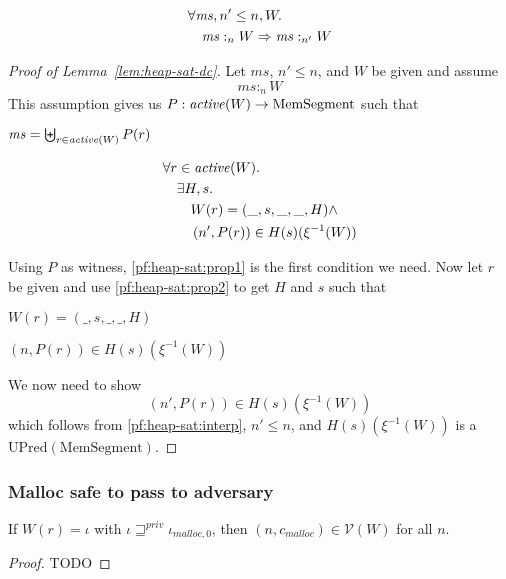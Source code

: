 \documentclass[a4paper]{article}
\newcommand{\fun}{\rightarrow}
\newcommand{\var}[1]{\mathit{#1}}
\newcommand{\hs}{\var{ms}}
\newcommand{\ms}{\hs}
\newcommand{\heap}{\var{mem}}
\newcommand{\plainfun}[2]{
  \ifthenelse{\equal{#2}{}}
  {\mathit{#1}}
  {\mathit{#1}(#2)}
}
\newcommand{\activeReg}[1]{\plainfun{active}{#1}}
\newcommand{\futurestr}{\mathbin{\sqsupseteq}^{\var{priv}}}
\newcommand{\heapSat}[3][\heap]{#1 :_{#2} #3}
\newcommand{\codelabel}[1]{\mathit{#1}}
\newcommand{\malloc}{\codelabel{malloc}}
\newcommand{\asmType}{\plaindom{AsmType}}
\newcommand{\plaindom}[1]{\mathrm{#1}}
\newcommand{\HeapSegments}{\plaindom{MemSegment}}
\newcommand{\MemSegments}{\HeapSegments}
\newcommand{\UPred}[1]{\plaindom{UPred}(#1)}
\newcommand{\intr}[2]{\mathcal{#1}}
\newcommand{\valueintr}[1]{\intr{V}{#1}}
\newcommand{\stdvr}{\valueintr{\asmType}}
\newcommand{\npair}[2][n]{\left(#1,#2 \right)}
\begin{document}
\begin{lemma}
  \label{lem:heap-sat-dc}
  \begin{align*}
    &\forall \hs, n' \leq n, W \ldotp \\
    &\quad \heapSat[\hs]{n}{W} \Rightarrow \heapSat[\hs]{n'}{W}
  \end{align*}
\end{lemma} 
\begin{proof}[Proof of Lemma~\ref{lem:heap-sat-dc}]
  Let $\ms$, $n' \leq n$, and $W$ be given and assume
  \[
    \heapSat[\hs]{n}{W}
  \]
  This assumption gives us $P : \activeReg{W} \fun \MemSegments$ such that
  \begin{enumproof}
    \item $\hs = \biguplus_{r\in\activeReg{W}}P(r)$ \label{pf:heap-sat:prop1}
    \item \label{pf:heap-sat:prop2}
      \begin{align*}
        &\forall r \in \activeReg{W} \ldotp\\
        &\quad \exists H,s \ldotp\\
        &\qquad W(r) = (\_,s,\_,\_,H) \land \\
        &\qquad \npair[n']{P(r)} \in H(s)(\xi^{-1}(W))
      \end{align*}
  \end{enumproof}
  Using $P$ as witness, \ref{pf:heap-sat:prop1} is the first condition we need. Now let $r$ be given and use \ref{pf:heap-sat:prop2} to get $H$ and $s$ such that
  \begin{enumproof}[resume]
    \item $W(r) = (\_,s,\_,\_,H)$ 
    \item $\npair[n]{P(r)} \in H(s)(\xi^{-1}(W))$ \label{pf:heap-sat:interp}
  \end{enumproof}
We now need to show
\[
        \npair[n']{P(r)} \in H(s)(\xi^{-1}(W))
\]
which follows from \ref{pf:heap-sat:interp}, $n' \leq n$, and $H(s)(\xi^{-1}(W))$ is a $\UPred{\MemSegments}$.
\end{proof}

\subsubsection{Malloc safe to pass to adversary}
\label{sec:malloc-valrel}

\begin{lemma}
  \label{lem:malloc-in-vr}
  If $W(r) = \iota$ with $\iota \futurestr \iota_{\malloc,0}$, then
  $\npair{c_\malloc} \in \stdvr(W)$ for all $n$.
\end{lemma}
\begin{proof}
  TODO
\end{proof}
\end{document}
